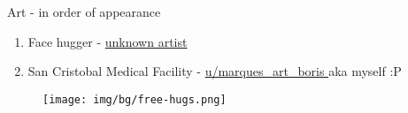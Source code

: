\begin{rpg-commentbox}{Art - in order of appearance}
\begin{enumerate}
        \item Face hugger - \href{https://i.pinimg.com/originals/09/90/9d/09909d88705fc1303381a6672b05163b.jpg}{unknown artist}

        \item San Cristobal Medical Facility - \href{https://www.reddit.com/r/SWN/comments/k53xgb/map_series_sevastopol_san_cristobal_medical/}{u/marques\_art\_boris
        } aka myself :P
    \end{enumerate}
\end{rpg-commentbox} 

  
\newsect

\begin{figure}[!b]
    \centering
    \texttt{[image: img/bg/free-hugs.png]}
\end{figure}


\clearpage
